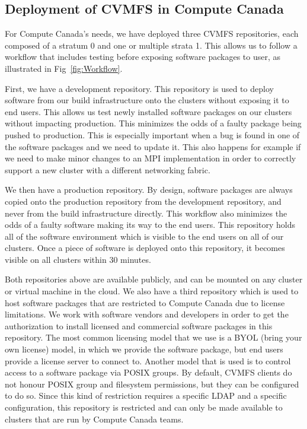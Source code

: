 \documentclass[sigconf]{acmart}
\begin{document}
\subsection{Deployment of CVMFS in Compute Canada}
\label{sub:CVMFS_in_CC}
For Compute Canada's needs, we have deployed three CVMFS repositories, each composed of a stratum 0 and one or multiple strata 1. This allows us to follow a workflow that includes testing before exposing software packages to user, as illustrated in Fig~\ref{fig:Workflow}.

First, we have a development repository. This repository is used to deploy software from our build infrastructure onto the clusters without exposing it to end users. This allows us test newly installed software packages on our clusters without impacting production. This minimizes the odds of a faulty package being pushed to production. This is especially important when a bug is found in one of the software packages and we need to update it. This also happens for example if we need to make minor changes to an MPI implementation in order to correctly support a new cluster with a different networking fabric. 

We then have a production repository. By design, software packages are always copied onto the production repository from the development repository, and never from the build infrastructure directly. This workflow also minimizes the odds of a faulty software making its way to the end users. This repository holds all of the software environment which is visible to the end users on all of our clusters. Once a piece of software is deployed onto this repository, it becomes visible on all clusters within 30 minutes. 

Both repositories above are available publicly, and can be mounted on any cluster or virtual machine in the cloud. We also have a third repository which is used to host software packages that are restricted to Compute Canada due to license limitations. We work with software vendors and developers in order to get the authorization to install licensed and commercial software packages in this repository. The most common licensing model that we use is a BYOL (bring your own license) model, in which we provide the software package, but end users provide a license server to connect to. Another model that is used is to control access to a software package via POSIX groups. By default, CVMFS clients do not honour POSIX group and filesystem permissions, but they can be configured to do so. Since this kind of restriction requires a specific LDAP and a specific configuration, this repository is restricted and can only be made available to clusters that are run by Compute Canada teams. 
\end{document}
